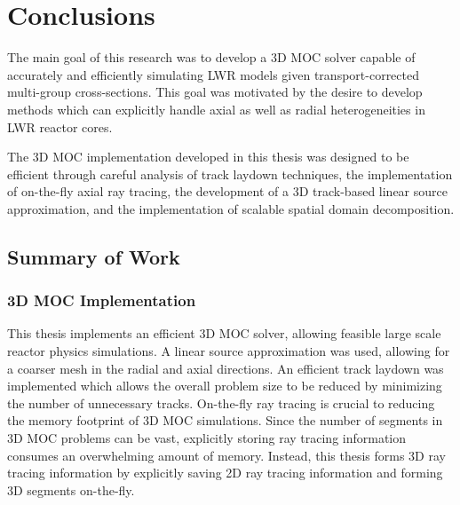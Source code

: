 \chapter{Conclusions}
\label{chap:conclusions}

The main goal of this research was to develop a 3D \ac{MOC} solver capable of accurately and efficiently simulating \ac{LWR} models given transport-corrected multi-group cross-sections. This goal was motivated by the desire to develop methods which can explicitly handle axial as well as radial heterogeneities in \ac{LWR} reactor cores. 

The 3D \ac{MOC} implementation developed in this thesis was designed to be efficient through careful analysis of track laydown techniques, the implementation of on-the-fly axial ray tracing, the development of a 3D track-based linear source approximation, and the implementation of scalable spatial domain decomposition.



\section{Summary of Work}
\label{sec:work-summary}


\subsection{3D MOC Implementation}
\label{sec:sub:3dmoc-imp}

This thesis implements an efficient 3D \ac{MOC} solver, allowing feasible large scale reactor physics simulations. A linear source approximation was used, allowing for a coarser mesh in the radial and axial directions. An efficient track laydown was implemented which allows the overall problem size to be reduced by minimizing the number of unnecessary tracks. On-the-fly ray tracing is crucial to reducing the memory footprint of 3D \ac{MOC} simulations. Since the number of segments in 3D \ac{MOC} problems can be vast, explicitly storing ray tracing information consumes an overwhelming amount of memory. Instead, this thesis forms 3D ray tracing information by explicitly saving 2D ray tracing information and forming 3D segments on-the-fly.

